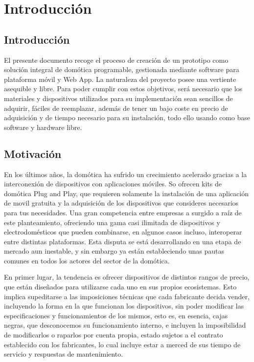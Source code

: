 \cleardoublepage

\chapter{Introducción}

\section{Introducción}
\label{ch:Capitulo1}
El presente documento recoge el proceso de creación de un prototipo como solución integral de domótica programable, gestionada mediante software para plataforma móvil y Web App. La naturaleza del proyecto posee una vertiente asequible y libre. Para poder cumplir con estos objetivos, será necesario que los materiales y dispositivos utilizados para su implementación sean sencillos de adquirir, fáciles de reemplazar, además de tener un bajo coste en precio de adquisición y de tiempo necesario para su instalación, todo ello usando como base software y hardware libre.

\section{Motivación}
\label{ch:Capitulo1.1}

En los últimos años, la domótica ha sufrido un crecimiento acelerado gracias a la interconexión de dispositivos con aplicaciones móviles. So ofrecen kits de domótica Plug and Play, que requieren solamente la instalación de una aplicación de movil gratuita y la adquisición de los dispositivos que consideres necesarios para tus necesidades. Una gran competencia entre empresas a surgido a raíz de este planteamiento, ofreciendo una gama casi ilimitada de dispositivos y electrodomésticos que pueden combinarse, en algunos casos incluso, interoperar entre distintas plataformas. Esta disputa se está desarrollando en una etapa de mercado aun inestable, y sin embargo ya están estableciendo unas pautas comunes en todos los actores del sector de la domótica.

En primer lugar, la tendencia es ofrecer dispositivos de distintos rangos de precio, que están diseñados para utilizarse cada uno en sus propios ecosistemas. Esto implica supeditarse a las imposiciones técnicas que cada fabricante decida vender, incluyendo la forma en la que funcionan los dispositivos, sin poder modificar las especificaciones y funcionamientos de los mismos, esto es, en esencia, cajas negras, que desconocemos su funcionamiento interno, e incluyen la imposibilidad de modificarlos o raparlos por cuenta propia, estado sujetos a el contrato establecido con los fabricantes, lo cual incluye estar a merced de sus tiempo de servicio y respuestas de mantenimiento.


